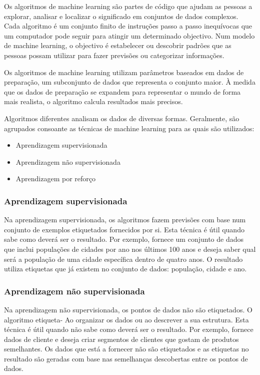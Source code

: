 \documentclass[a4paper,10pt]{article}
\begin{document}
Os algoritmos de machine learning são partes de código que ajudam as pessoas a explorar, analisar e localizar o significado em conjuntos de dados complexos.
Cada algoritmo é um conjunto finito de instruções passo a passo inequívocas que um computador pode seguir para atingir um determinado objectivo.
Num modelo de machine learning, o objectivo é estabelecer ou descobrir padrões que as pessoas possam utilizar para fazer previsões ou categorizar informações.

Os algoritmos de machine learning utilizam parâmetros baseados em dados de preparação, um subconjunto de dados que representa o conjunto maior.
À medida que os dados de preparação se expandem para representar o mundo de forma mais realista, o algoritmo calcula resultados mais precisos.

Algoritmos diferentes analisam os dados de diversas formas.
Geralmente, são agrupados consoante as técnicas de machine learning para as quais são utilizados:
\begin{itemize}
    \item Aprendizagem supervisionada
    \item Aprendizagem não supervisionada
    \item Aprendizagem por reforço
\end{itemize}

\subsubsection{Aprendizagem supervisionada}

Na aprendizagem supervisionada, os algoritmos fazem previsões com base num conjunto de exemplos etiquetados fornecidos por si.
Esta técnica é útil quando sabe como deverá ser o resultado.
Por exemplo, fornece um conjunto de dados que inclui populações de cidades por ano nos últimos 100 anos e deseja saber qual será a população de uma cidade específica dentro de quatro anos.
O resultado utiliza etiquetas que já existem no conjunto de dados: população, cidade e ano.

\subsubsection{Aprendizagem não supervisionada}

Na aprendizagem não supervisionada, os pontos de dados não são etiquetados.
O algoritmo etiqueta- Ao organizar os dados ou ao descrever a sua estrutura.
Esta técnica é útil quando não sabe como deverá ser o resultado.
Por exemplo, fornece dados de cliente e deseja criar segmentos de clientes que gostam de produtos semelhantes.
Os dados que está a fornecer não são etiquetados e as etiquetas no resultado são geradas com base nas semelhanças descobertas entre os pontos de dados.
\end{document}
